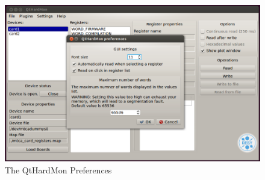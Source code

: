 \begin{figure}[htbp]
\centering
\includegraphics[width=1\textwidth]{images/preferences.png}
 \caption{The QtHardMon Preferences}
\label{qthardmon_preferences}
\end{figure}


%
%


%
%
%
%
%




